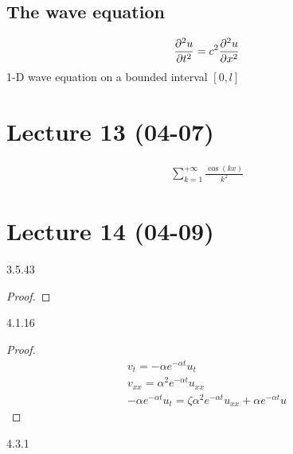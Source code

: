 \subsection{The wave equation}
\begin{equation}
    \label{eq:4.3} \pdv[2]{u}{t}=c^2\pdv[2]{u}{x}
\end{equation}
1-D wave equation on a bounded interval $ [0,l] $ 
\section{Lecture 13 (04-07)}
\begin{align*}{}{}
\sum_{k=1}^{+\infty}\frac{\cos(kx)}{k^2}
\end{align*}
\section{Lecture 14 (04-09)}
3.5.43
\begin{proof}
\end{proof}
4.1.16
\begin{proof}
    \begin{align*}{}{}
    v_t=-\alpha e^{-\alpha t}u_t\\
    v_{xx}=\alpha^2 e^{-\alpha t}u_{xx}\\
    -\alpha e^{-\alpha t}u_t=\zeta \alpha^2 e^{-\alpha t}u_{xx}+\alpha e^{-\alpha t}u
    \end{align*}
\end{proof}
4.3.1
